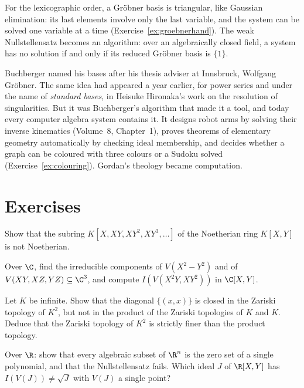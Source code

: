 For the lexicographic order, a Gröbner basis is triangular, like Gaussian elimination: its last elements involve only the last variable, and the system can be solved one variable at a time (Exercise~\ref{ex:groebnerhand}).
The weak Nullstellensatz becomes an algorithm: over an algebraically closed field, a system has no solution if and only if its reduced Gröbner basis is $\{1\}$.

\begin{beauty}
Buchberger named his bases after his thesis adviser at Innsbruck, Wolfgang Gröbner. The same idea had appeared a year earlier, for power series and under the name of
\emph{standard bases}, in Heisuke Hironaka's work on the resolution of singularities. But it was Buchberger's algorithm that made it a tool, and today every computer algebra system contains it. It designs robot arms by solving their inverse
kinematics (Volume~8, Chapter~1), proves theorems of elementary geometry automatically by checking ideal membership, and decides whether a graph can be coloured with three colours or a Sudoku solved
(Exercise~\ref{ex:colouring}). Gordan's theology became computation.
\end{beauty}

\section{Exercises}

\begin{exercise}[$\star$]\label{ex:nonnoeth}
Show that the subring $K[X,XY,XY^2,XY^3,\dots]$ of the Noetherian ring $K[X,Y]$ is not Noetherian.
\end{exercise}

\begin{exercise}[$\star$]\label{ex:radicals}
Over $\C$, find the irreducible components of $V(X^2-Y^2)$ and of $V(XY,XZ,YZ)\subseteq\C^3$, and compute $I(V(X^2Y,XY^2))$ in $\C[X,Y]$.
\end{exercise}

\begin{exercise}[$\star\star$]\label{ex:notproduct}
Let $K$ be infinite. Show that the diagonal $\{(x,x)\}$ is closed in the Zariski topology of $K^2$, but not in the product of the Zariski topologies of $K$ and $K$. Deduce that the Zariski topology of $K^2$ is strictly finer
than the product topology.
\end{exercise}

\begin{exercise}[$\star\star$]\label{ex:realnull}
Over $\R$: show that every algebraic subset of $\R^n$ is the zero set of a single polynomial, and that the Nullstellensatz fails. Which ideal $J$ of $\R[X,Y]$ has $I(V(J))\ne\sqrt J$ with $V(J)$ a single point?
\end{exercise}

